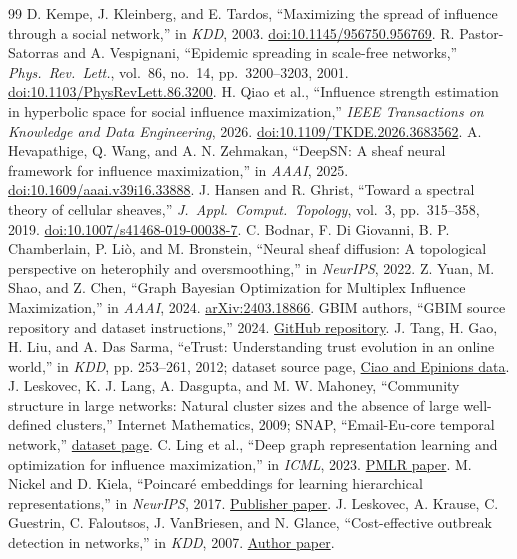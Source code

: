 \documentclass[10pt,twocolumn]{article}
\begin{document}
\balance
\begin{thebibliography}{99}
 D. Kempe, J. Kleinberg, and E. Tardos, ``Maximizing the spread of influence through a social network,'' in \emph{KDD}, 2003. \href{https://doi.org/10.1145/956750.956769}{doi:10.1145/956750.956769}.
 R. Pastor-Satorras and A. Vespignani, ``Epidemic spreading in scale-free networks,'' \emph{Phys.\ Rev.\ Lett.}, vol.~86, no.~14, pp.~3200--3203, 2001. \href{https://doi.org/10.1103/PhysRevLett.86.3200}{doi:10.1103/PhysRevLett.86.3200}.
 H. Qiao et al., ``Influence strength estimation in hyperbolic space for social influence maximization,'' \emph{IEEE Transactions on Knowledge and Data Engineering}, 2026. \href{https://doi.org/10.1109/TKDE.2026.3683562}{doi:10.1109/TKDE.2026.3683562}.
 A. Hevapathige, Q. Wang, and A. N. Zehmakan, ``DeepSN: A sheaf neural framework for influence maximization,'' in \emph{AAAI}, 2025. \href{https://doi.org/10.1609/aaai.v39i16.33888}{doi:10.1609/aaai.v39i16.33888}.
 J. Hansen and R. Ghrist, ``Toward a spectral theory of cellular sheaves,'' \emph{J.\ Appl.\ Comput.\ Topology}, vol.~3, pp.~315--358, 2019. \href{https://doi.org/10.1007/s41468-019-00038-7}{doi:10.1007/s41468-019-00038-7}.
 C. Bodnar, F. Di Giovanni, B. P. Chamberlain, P. Li{\`o}, and M. Bronstein, ``Neural sheaf diffusion: A topological perspective on heterophily and oversmoothing,'' in \emph{NeurIPS}, 2022.
 Z. Yuan, M. Shao, and Z. Chen, ``Graph Bayesian Optimization for Multiplex Influence Maximization,'' in \emph{AAAI}, 2024. \href{https://arxiv.org/abs/2403.18866}{arXiv:2403.18866}.
 GBIM authors, ``GBIM source repository and dataset instructions,'' 2024. \href{https://github.com/zirui-yuan/GBIM}{GitHub repository}.
 J. Tang, H. Gao, H. Liu, and A. Das Sarma, ``eTrust: Understanding trust evolution in an online world,'' in \emph{KDD}, pp. 253--261, 2012; dataset source page, \href{https://www.cse.msu.edu/~tangjili/datasetcode/truststudy.htm}{Ciao and Epinions data}.
 J. Leskovec, K. J. Lang, A. Dasgupta, and M. W. Mahoney, ``Community structure in large networks: Natural cluster sizes and the absence of large well-defined clusters,'' Internet Mathematics, 2009; SNAP, ``Email-Eu-core temporal network,'' \href{https://snap.stanford.edu/data/email-Eu-core-temporal.html}{dataset page}.
 C. Ling et al., ``Deep graph representation learning and optimization for influence maximization,'' in \emph{ICML}, 2023. \href{https://proceedings.mlr.press/v202/ling23b.html}{PMLR paper}.
 M. Nickel and D. Kiela, ``Poincar\'e embeddings for learning hierarchical representations,'' in \emph{NeurIPS}, 2017. \href{https://proceedings.neurips.cc/paper/2017/hash/59dfa2df42d9e3d41f5b02bfc32229dd-Abstract.html}{Publisher paper}.
 J. Leskovec, A. Krause, C. Guestrin, C. Faloutsos, J. VanBriesen, and N. Glance, ``Cost-effective outbreak detection in networks,'' in \emph{KDD}, 2007. \href{https://las.inf.ethz.ch/files/leskovec07cost.pdf}{Author paper}.
\end{thebibliography}
\end{document}
